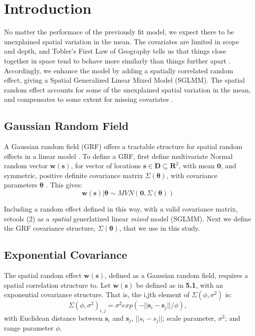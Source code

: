 
\section{Introduction} %

No matter the performace of the previously fit model, we expect there to be unexplained spatial variation in the mean. The covariates are limited in scope and depth, and Tobler's First Law of Geography tells us that things close together in space tend to behave more similarly than things further apart \citep{Tobler1970}. Accordingly, we enhance the model by adding a spatially correlated random effect, giving a Spatial Generalized Linear Mixed Model (SGLMM). The spatial random effect accounts for some of the unexplained spatial variation in the mean, and compensates to some extent for missing covariates \citep{Banerjee2008}. 

\subsection{Gaussian Random Field} %

A Gaussian random field (GRF) offers a tractable structure for spatial random effects in a linear model \citep{Gelfand2010}. To define a GRF, first define multivariate Normal random vector $\pmb{w}(\pmb{s})$, for vector of locations $\pmb{s} \in \pmb{D} \subseteq \pmb{R}^{2}$, with mean $\pmb{0}$, and symmetric, positive definite covariance matrix $\Sigma(\pmb{\theta})$, with covariance parameters $\pmb{\theta}$ \citep{Haran2011}. This gives:
$$ \pmb{w}(\pmb{s}) | \pmb{\theta} \sim MVN(\pmb{0}, \Sigma(\pmb{\theta})) $$

Including a random effect defined in this way, with a valid covariance matrix, retools (2) as a {\it spatial} generlatized linear {\it mixed} model (SGLMM). Next we define the GRF covariance structure, $\Sigma(\pmb{\theta})$, that we use in this study.

\subsection{Exponential Covariance}
The spatial random effect $\pmb{w}(\pmb{s})$, defined as a Gaussian random field, requires a spatial correlation structure to. Let $\pmb{w}(\pmb{s})$ be defined as in {\bf 5.1}, with an exponential covariance structure. That is, the i,jth element of $\Sigma(\phi, \sigma^{2})$ is:
\begin{equation}
\Sigma(\phi, \sigma^{2})_{i,j} = \sigma^{2} exp(-||\pmb{s}_{i} - \pmb{s}_{j}||/\phi),
\end{equation}
with  Euclidean distance between $\pmb{s}_{i}$ and $\pmb{s}_{j}$, $||s_{i} - s_{j}||$; scale parameter, $\sigma^{2}$; and range parameter $\phi$.

